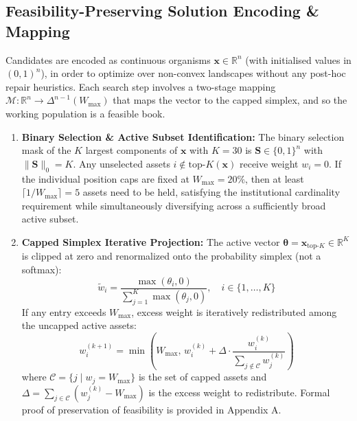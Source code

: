 \documentclass[11pt,a4paper]{article}
\begin{document}
\subsection{Feasibility-Preserving Solution Encoding \& Mapping}
Candidates are encoded as continuous organisms $\mathbf{x} \in \mathbb{R}^n$ (with initialised values in $(0,1)^n$), in order to optimize over non-convex landscapes without any post-hoc repair heuristics. Each search step involves a two-stage mapping $\mathcal{M}: \mathbb{R}^n \to \Delta^{n-1}(W_{\max})$ that maps the vector to the capped simplex, and so the working population is a feasible book.
\begin{enumerate}
    \item \textbf{Binary Selection \& Active Subset Identification:} The binary selection mask of the $K$ largest components of $\mathbf{x}$ with $K=30$ is $\mathbf{S} \in \{0, 1\}^n$ with $\|\mathbf{S}\|_0 = K$. Any unselected assets $i \notin \text{top-}K(\mathbf{x})$ receive weight $w_i = 0$. If the individual position caps are fixed at $W_{\max}=20\%$, then at least $\lceil 1/W_{\max} \rceil = 5$ assets need to be held, satisfying the institutional cardinality requirement while simultaneously diversifying across a sufficiently broad active subset.
    \item \textbf{Capped Simplex Iterative Projection:} The active vector $\boldsymbol{\theta} = \mathbf{x}_{\text{top-}K} \in \mathbb{R}^K$ is clipped at zero and renormalized onto the probability simplex (not a softmax):
    \begin{equation}
    \tilde{w}_i = \frac{\max(\theta_i,0)}{\sum_{j=1}^K \max(\theta_j,0)}, \quad i \in \{1, \dots, K\}
    \end{equation}
    If any entry exceeds $W_{\max}$, excess weight is iteratively redistributed among the uncapped active assets:
    \begin{equation}
    w_i^{(k+1)} = \min\left(W_{\max}, \, w_i^{(k)} + \Delta \cdot \frac{w_i^{(k)}}{\sum_{j \notin \mathcal{C}} w_j^{(k)}}\right)
    \end{equation}
    where $\mathcal{C} = \{j \mid w_j = W_{\max}\}$ is the set of capped assets and $\Delta = \sum_{j \in \mathcal{C}} (w_j^{(k)} - W_{\max})$ is the excess weight to redistribute. Formal proof of preservation of feasibility is provided in Appendix A.
\end{enumerate}
\end{document}
